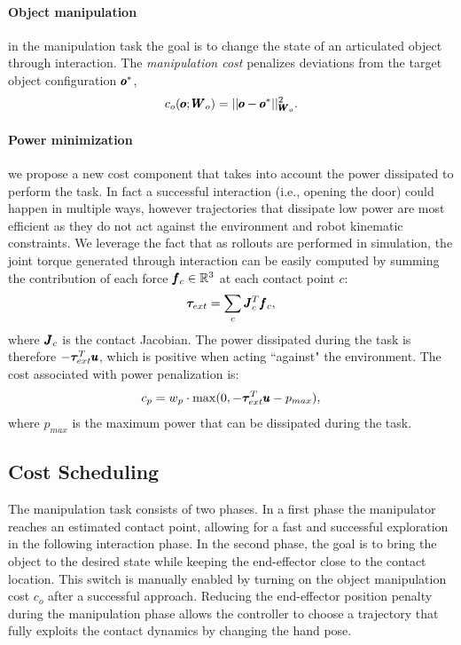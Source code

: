  \paragraph{Object manipulation} in the manipulation task the goal is to change the state of an articulated object through interaction. The \textit{manipulation cost} penalizes deviations from the target object configuration $\pmb{o}^{*}$,
\begin{equation}
    c_o(\pmb{o}; \pmb{W}_{o}) = || \pmb{o} - \pmb{o}^{*}||^2_{\pmb{W}_{o}}.
\end{equation}
\paragraph{Power minimization} we propose a new cost component that takes into account the power dissipated to perform the task. In fact a successful interaction (i.e., opening the door) could happen in multiple ways, however trajectories that dissipate low power are most efficient as they do not act against the environment and robot kinematic constraints. We leverage the fact that as rollouts are performed in simulation, the joint torque generated through interaction can be easily computed by summing the contribution of each force $\pmb{f}_c \in \mathbb{R}^{3}$ at each contact point $c$:
\begin{equation}
\boldsymbol{\tau}_{ext} = \sum\limits_{c} \pmb{J}_c^T \pmb{f}_c,    
\end{equation}
where $\pmb{J}_c$ is the contact Jacobian. The power dissipated during the task is therefore $-\boldsymbol{\tau}_{ext}^T\pmb{u}$, which is positive when acting ``against" the environment. The cost associated with power penalization is:
\begin{equation}
   c_p = w_{p} \cdot \max(0, - \boldsymbol{\tau}_{ext}^T\pmb{u} - p_{max}),      
 \end{equation}
where $p_{max}$ is the maximum power that can be dissipated during the task.

\subsection{Cost Scheduling}
The manipulation task consists of two phases. In a first phase the manipulator reaches an estimated contact point, allowing for a fast and successful exploration in the following interaction phase. In the second phase, the goal is to bring the object to the desired state while keeping the end-effector close to the contact location. This switch is manually enabled by turning on the object manipulation cost $c_o$ after a successful approach. Reducing the end-effector position penalty during the manipulation phase allows the controller to choose a trajectory that fully exploits the contact dynamics by changing the hand pose.

